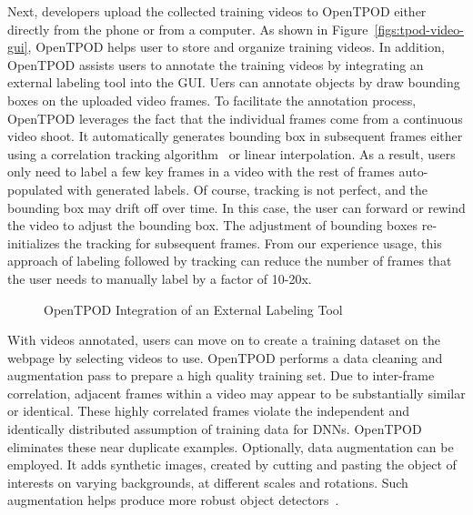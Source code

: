 Next, developers upload the collected training videos to OpenTPOD either directly
from the phone or from a computer. As shown in Figure~\ref{figs:tpod-video-gui},
OpenTPOD helps user to store and organize training videos. In addition, OpenTPOD assists
users to annotate the training videos by integrating an external labeling tool
into the GUI. Uers can annotate objects by draw bounding boxes on the uploaded
video frames. To facilitate the annotation process, OpenTPOD leverages the fact that
the individual frames come from a continuous video shoot. It automatically
generates bounding box in subsequent frames either using a correlation tracking
algorithm~\cite{danelljan2014accurate} or linear interpolation. As a result,
users only need to label a few key frames in a video with the rest of frames
auto-populated with generated labels. Of course, tracking is not perfect, and
the bounding box may drift off over time. In this case, the user can forward or
rewind the video to adjust the bounding box.  The adjustment of bounding boxes
re-initializes the tracking for subsequent frames. From our experience usage,
this approach of labeling followed by tracking can reduce the number of frames
that the user needs to manually label by a factor of 10-20x.

\begin{figure}[]
  \centering
    \caption{OpenTPOD Integration of an External Labeling Tool}
  \label{figs:tpod-label-gui}
\end{figure}

With videos annotated, users can move on to create a training dataset on the
webpage by selecting videos to use. OpenTPOD performs a data cleaning and
augmentation pass to prepare a high quality training set. Due to inter-frame
correlation, adjacent frames within a video may appear to be substantially
similar or identical. These highly correlated frames violate the independent and
identically distributed assumption of training data for DNNs. OpenTPOD eliminates
these near duplicate examples. Optionally, data augmentation can be employed. It
adds synthetic images, created by cutting and pasting the object of interests on
varying backgrounds, at different scales and rotations. Such augmentation helps
produce more robust object detectors~\cite{dwibedi2017cut}.

